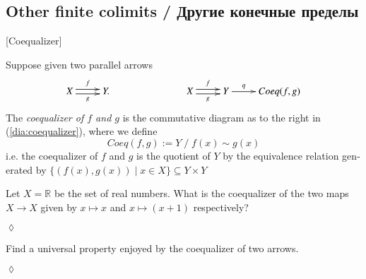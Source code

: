 \documentclass{book}
\def\RR{{\mathbb R}}
\def\to{\rightarrow}
\def\ss{\subseteq}
\def\|{{\;|\;}}
\theoremstyle{theoremENG}
\theoremstyle{lemmaENG}
\newtheorem{lemmaENG}[subsubsection]{\begin{english}Lemma\end{english}}
\theoremstyle{propositionENG}
\theoremstyle{corollaryENG}
\theoremstyle{factENG}
\theoremstyle{remarkENG}
\theoremstyle{exampleENG}
\theoremstyle{warningENG}
\theoremstyle{questionENG}
\theoremstyle{guessENG}
\theoremstyle{answerENG}
\theoremstyle{constructionENG}
\theoremstyle{rulesENG}
\theoremstyle{excENG}
\newtheorem{excENG}[subsubsection]{\begin{english}Exercise\end{english}}
\theoremstyle{appENG}
\theoremstyle{definitionENG}
\newtheorem{definitionENG}[subsubsection]{\begin{english}Definition\end{english}}
\theoremstyle{notationENG}
\theoremstyle{conjectureENG}
\theoremstyle{postulateENG}
\newenvironment{exerciseENG}{\begin{excENG}}{\hspace*{\fill}$\lozenge$\end{excENG}}
\theoremstyle{theoremRUS}
\theoremstyle{lemmaRUS}
\theoremstyle{propositionRUS}
\theoremstyle{corollaryRUS}
\theoremstyle{factRUS}
\theoremstyle{remarkRUS}
\theoremstyle{exampleRUS}
\theoremstyle{warningRUS}
\theoremstyle{questionRUS}
\theoremstyle{guessRUS}
\theoremstyle{answerRUS}
\theoremstyle{constructionRUS}
\theoremstyle{rulesRUS}
\theoremstyle{excRUS}
\theoremstyle{appRUS}
\theoremstyle{definitionRUS}
\theoremstyle{notationRUS}
\theoremstyle{conjectureRUS}
\theoremstyle{postulateRUS}
\begin{document}
\begin{english}
\begin{lemmaENG}
\begin{russian} \end{russian}

\end{lemmaENG}


\subsection{Other finite colimits / Другие конечные пределы}

\begin{definitionENG}\label{def:coequalizer}[Coequalizer]

Suppose given two parallel arrows 
\begin{align}\label{dia:coequalizer}
\xymatrix{X\ar@<.5ex>[r]^f\ar@<-.5ex>[r]_g&Y.}\hspace{1in}\xymatrix{X\ar@<.5ex>[r]^f\ar@<-.5ex>[r]_g&Y\ar[r]^-q&Coeq(f,g)}
\end{align}
The {\em coequalizer of $f$ and $g$} is the commutative diagram as to the right in (\ref{dia:coequalizer}), where we define $$Coeq(f,g):=Y\;/\;f(x)\sim g(x)$$ i.e. the coequalizer of $f$ and $g$ is the quotient of $Y$ by the equivalence relation generated by $\{(f(x),g(x))\|x\in X\}\ss Y\times Y$

\begin{russian} \end{russian}

\end{definitionENG}

\begin{exerciseENG}

Let $X=\RR$ be the set of real numbers. What is the coequalizer of the two maps $X\to X$ given by $x\mapsto x$ and $x\mapsto (x+1)$ respectively?

\begin{russian} \end{russian}

\end{exerciseENG}

\begin{exerciseENG}

Find a universal property enjoyed by the coequalizer of two arrows.

\begin{russian} \end{russian}

\end{exerciseENG}


\end{english}
\end{document}
